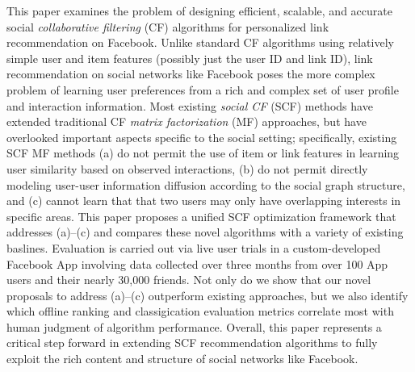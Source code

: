 This paper examines the problem of designing efficient, scalable, and
accurate social \emph{collaborative filtering} (CF) algorithms for
personalized link recommendation on Facebook.  Unlike standard CF
algorithms using relatively simple user and item features (possibly
just the user ID and link ID), link recommendation on social networks
like Facebook poses the more complex problem of learning user
preferences from a rich and complex set of user profile and
interaction information.  Most existing \emph{social CF} (SCF) methods
have extended traditional CF \emph{matrix factorization} (MF)
approaches, but have overlooked important aspects specific to the
social setting; specifically, existing SCF MF methods (a) do not
permit the use of item or link features in learning user similarity
based on observed interactions, (b) do not permit directly modeling
user-user information diffusion according to the social graph
structure, and (c) cannot learn that that two users may only have
overlapping interests in specific areas.  
This paper proposes a unified SCF optimization framework that
addresses (a)--(c) and compares these novel algorithms with a variety
of existing baslines.  Evaluation is carried out via live user trials
in a custom-developed Facebook App involving data collected over three
months from over 100 App users and their nearly 30,000 friends.  Not
only do we show that our novel proposals to address (a)--(c)
outperform existing approaches, but we also identify which offline
ranking and classigication evaluation metrics correlate most with
human judgment of algorithm performance.  Overall, this paper
represents a critical step forward in extending SCF recommendation
algorithms to fully exploit the rich content and structure of social
networks like Facebook.